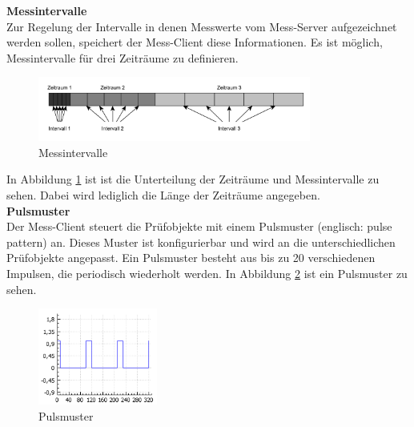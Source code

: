 \textbf{Messintervalle}\\
Zur Regelung der Intervalle in denen Messwerte vom Mess-Server aufgezeichnet werden sollen, speichert der Mess-Client diese Informationen. Es ist möglich, Messintervalle für drei Zeiträume zu definieren.



\begin{figure}[H]
\begin{center}
\includegraphics[width=0.8\textwidth]{img/general/Messintervalle.pdf}
\caption{Messintervalle}
\label{figure_Messintervalle}
\end{center}
\end{figure}

In Abbildung \ref{figure_Messintervalle} ist ist die Unterteilung der Zeiträume und Messintervalle zu sehen. Dabei wird lediglich die Länge der Zeiträume angegeben.\\


\textbf{Pulsmuster}\\
Der Mess-Client steuert die Prüfobjekte mit einem Pulsmuster (englisch: pulse pattern) an. Dieses Muster ist konfigurierbar und wird an die unterschiedlichen Prüfobjekte angepasst. Ein Pulsmuster besteht aus bis zu 20 verschiedenen Impulsen, die periodisch wiederholt werden. In Abbildung \ref{figure_Pulsepattern} ist ein Pulsmuster zu sehen.\\


\begin{figure}[H]
\begin{center}
\includegraphics[width=0.35\textwidth]{img/general/Pulsepattern.PNG}
\caption{Pulsmuster}
\label{figure_Pulsepattern}
\end{center}
\end{figure}


